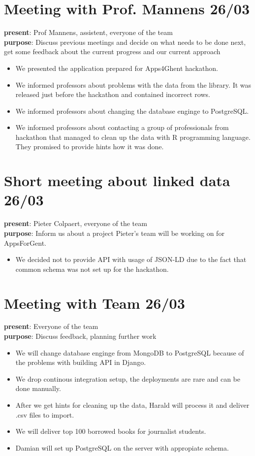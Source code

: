 \section{Meeting with Prof. Mannens 26/03}
{\bf present}: Prof Mannens, assistent, everyone of the team\\
{\bf purpose}: Discuss previous meetings and decide on what needs to be done next, get some feedback about the current progress and our current approach\\
\begin{itemize}
	\item We presented the application prepared for Apps4Ghent hackathon.
	\item We informed professors about problems with the data from the library. It was released just before the hackathon and contained incorrect rows.
	\item We informed professors about changing the database enginge to PostgreSQL.
	\item We informed professors about contacting a group of professionals from hackathon that managed to clean up the data with R programming language. They promised to provide hints how it was done.
\end{itemize}

\section{Short meeting about linked data 26/03}
{\bf present}: Pieter Colpaert, everyone of the team\\
{\bf purpose}: Inform us about a project Pieter's team will be working on for AppsForGent.
\begin{itemize}
	\item We decided not to provide API with usage of JSON-LD due to the fact that common schema was not set up for the hackathon.
\end{itemize}

\section{Meeting with Team 26/03}
{\bf present}: Everyone of the team\\
{\bf purpose}: Discuss feedback, planning further work\\
\begin{itemize}
	\item We will change database enginge from MongoDB to PostgreSQL because of the problems with building API in Django.
	\item We drop continous integration setup, the deployments are rare and can be done manually.
	\item After we get hints for cleaning up the data, Harald will process it and deliver .csv files to import.
	\item We will deliver top 100 borrowed books for journalist students.
	\item Damian will set up PostgreSQL on the server with appropiate schema.
\end{itemize}

